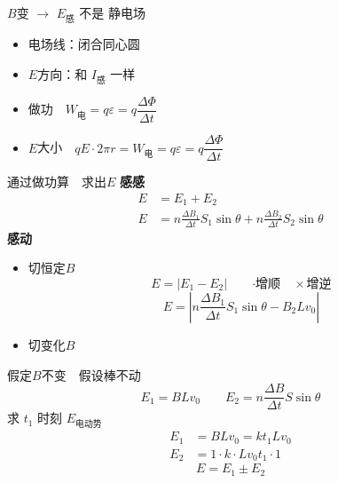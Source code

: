 $B$变 $\to$ $E_{\text{感}}$ 不是 静电场
\begin{itemize}
  \item 电场线：闭合同心圆
  \item $E$方向：和 $I_{\text{感}}$ 一样
  \item 做功　$W_{\text{电}}=q\varepsilon=q\dfrac{\Delta\Phi}{\Delta t}$
  \item $E$大小　$qE\cdot2\pi r=W_{\text{电}}=q\varepsilon=q\dfrac{\Delta\Phi}{\Delta t}$
\end{itemize}
通过做功算　求出$E$
\textbf{感感}
\begin{align*}
E&=E_1+E_2\\
E&=n\frac{\Delta B_1}{\Delta t}S_1\sin\theta+n\frac{\Delta B_2}{\Delta t}S_2\sin\theta
\end{align*}
\textbf{感动}
\begin{itemize}
  \item 切恒定$B$
\[
E=|E_1-E_2|\qquad\text{·增顺　}\times\text{增逆}
\]
\[
E=\left|n\frac{\Delta B_1}{\Delta t}S_1\sin\theta-B_2Lv_0\right|
\]
  \item 切变化$B$
\end{itemize}
假定$B$不变　假设棒不动
\[
E_1=BLv_0\qquad E_2=n\frac{\Delta B}{\Delta t}S\sin\theta
\]
求 $t_1$ 时刻 $E_{\text{电动势}}$
\begin{align*}
E_1&=BLv_0=kt_1Lv_0\\
E_2&=1\cdot k\cdot Lv_0t_1\cdot1
\end{align*}
\[
E=E_1\pm E_2
\]
